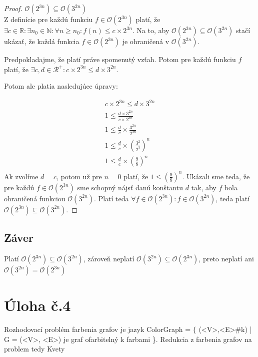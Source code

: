 \documentclass[10pt]{article}
\begin{document}
\begin{proof}
$\mathcal{O}(2^{3n}) \subseteq \mathcal{O}(3^{2n})$ \\
Z definície pre každú funkciu $f \in \mathcal{O}(2^{3n})$ platí, že $\exists c \in \mathbb{R}: \exists n_0 \in \mathbb{N}: \forall n \geq n_0: f(n) \leq c\times 2^{3n}$.  
Na to, aby $\mathcal{O}(2^{3n}) \subseteq \mathcal{O}(3^{2n})$ stačí ukázať, že každá funkcia $f \in \mathcal{O}(2^{3n})$ je ohraničená v $\mathcal{O}(3^{2n})$.

Predpokladajme, že platí práve spomenutý vzťah. Potom pre každú funkciu $f$ platí, že $\exists c,d \in \mathcal{R}^+: c \times 2^{3n} \leq d \times 3^{2n}$. 

Potom ale platia nasledujúce úpravy:

\begin{align*}
    c \times 2^{3n} \leq d \times 3^{2n}  \\
    1 \leq \frac{d \times 3^{2n}}{c \times 2^{3n}} \\
    1 \leq \frac{d}{c} \times \frac{3^{2n}}{2^{3n}} \\
    1 \leq \frac{d}{c} \times (\frac{3^{2}}{2^{3}})^n \\
    1 \leq \frac{d}{c} \times (\frac{9}{8})^n \\
\end{align*}
Ak zvolíme $d = c$, potom už pre $n = 0$ platí, že $1 \leq (\frac{9}{8})^n$.
Ukázali sme teda, že pre každú $f \in \mathcal{O}(2^{3n})$ sme schopný nájsť danú konštantu $d$ tak, aby $f$ bola ohraničená funkciou $\mathcal{O}(3^{2n})$.
Platí teda $\forall f \in \mathcal{O}(2^{3n}): f \in \mathcal{O}(3^{2n})$, teda platí $\mathcal{O}(2^{3n}) \subseteq \mathcal{O}(3^{2n})$. 
\end{proof}

\subsection*{Záver}
Platí $\mathcal{O}(2^{3n}) \subseteq \mathcal{O}(3^{2n})$, zároveň neplatí $\mathcal{O}(3^{2n}) \subseteq \mathcal{O}(2^{3n})$, preto neplatí ani $\mathcal{O}(3^{2n}) = \mathcal{O}(2^{3n})$


\section*{Úloha č.4}
Rozhodovací problém farbenia grafov je jazyk ColorGraph = $\{$ (<V>,<E>\#k) | G = (<V>, <E>) je graf
ofarbitelný k farbami \}.
Redukcia z farbenia grafov na problem tedy Kvety 
\end{document}
